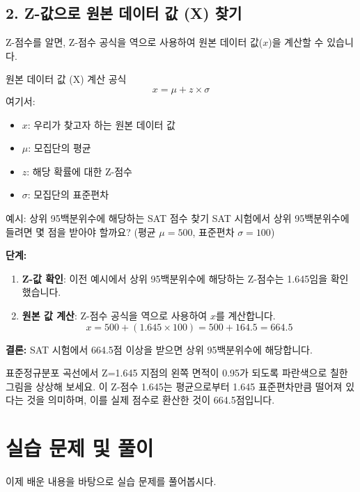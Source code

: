 \documentclass[11pt,a4paper]{article}
\begin{document}
\subsection*{2. Z-값으로 원본 데이터 값 (X) 찾기}
Z-점수를 알면, Z-점수 공식을 역으로 사용하여 원본 데이터 값($x$)을 계산할 수 있습니다.

\begin{keyconceptbox}{원본 데이터 값 (X) 계산 공식}
\[ x = \mu + z \times \sigma \]
여기서:
\begin{itemize}
    \item $x$: 우리가 찾고자 하는 원본 데이터 값
    \item $\mu$: 모집단의 평균
    \item $z$: 해당 확률에 대한 Z-점수
    \item $\sigma$: 모집단의 표준편차
\end{itemize}
\end{keyconceptbox}

\begin{examplebox}{예시: 상위 95백분위수에 해당하는 SAT 점수 찾기}
SAT 시험에서 상위 95백분위수에 들려면 몇 점을 받아야 할까요? (평균 $\mu=500$, 표준편차 $\sigma=100$)

\textbf{단계:}
\begin{enumerate}
    \item \textbf{Z-값 확인}: 이전 예시에서 상위 95백분위수에 해당하는 Z-점수는 1.645임을 확인했습니다.
    \item \textbf{원본 값 계산}: Z-점수 공식을 역으로 사용하여 $x$를 계산합니다.
    \[ x = 500 + (1.645 \times 100) = 500 + 164.5 = 664.5 \]
\end{enumerate}
\textbf{결론:} SAT 시험에서 664.5점 이상을 받으면 상위 95백분위수에 해당합니다.

\begin{tcolorbox}[title=\textbf{시각적 이해}, colback=blue!5!white, colframe=blue!75!black]
표준정규분포 곡선에서 Z=1.645 지점의 왼쪽 면적이 0.95가 되도록 파란색으로 칠한 그림을 상상해 보세요. 이 Z-점수 1.645는 평균으로부터 1.645 표준편차만큼 떨어져 있다는 것을 의미하며, 이를 실제 점수로 환산한 것이 664.5점입니다.
\end{tcolorbox}
\end{examplebox}

\newpage
\section*{실습 문제 및 풀이}
이제 배운 내용을 바탕으로 실습 문제를 풀어봅시다.
\end{document}
